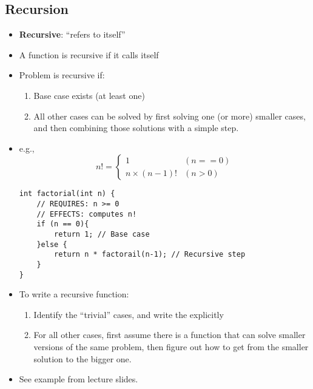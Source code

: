 \subsection{Recursion}
\begin{itemize}
	\item \textbf{Recursive}: ``refers to itself''
	\item A function is recursive if it calls itself
	\item Problem is recursive if:
	\begin{enumerate}
		\item Base case exists (at least one)
		\item All other cases can be solved by first solving one (or more) smaller cases, and then combining those solutions with a simple step.
	\end{enumerate}
	\item e.g.,
	$$n!=\begin{cases}
		1 &(n==0)\\
		n\times (n-1)! &(n>0)
	\end{cases}$$
\begin{lstlisting}[style=C++]
int factorial(int n) {
	// REQUIRES: n >= 0
	// EFFECTS: computes n!
	if (n == 0){
		return 1; // Base case
	}else {
		return n * factorail(n-1); // Recursive step
	}
}
\end{lstlisting}
	
	\item To write a recursive function:
	\begin{enumerate}
		\item Identify the ``trivial'' cases, and write the explicitly
		\item For all other cases, first assume there is a function that can solve smaller versions of the same problem, then figure out how to get from the smaller solution to the bigger one.
	\end{enumerate}
	\item See example from lecture slides.
\end{itemize}